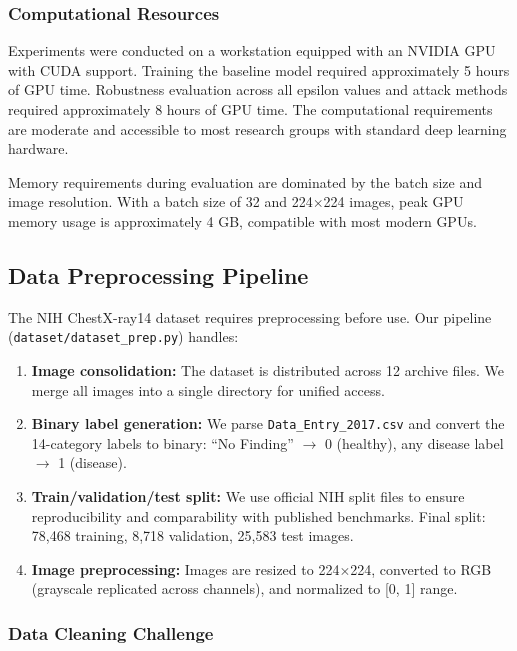 \documentclass[12pt,a4paper]{article}
\begin{document}
\subsubsection{Computational Resources}

Experiments were conducted on a workstation equipped with an NVIDIA GPU with CUDA support. Training the baseline model required approximately 5 hours of GPU time. Robustness evaluation across all epsilon values and attack methods required approximately 8 hours of GPU time. The computational requirements are moderate and accessible to most research groups with standard deep learning hardware.

Memory requirements during evaluation are dominated by the batch size and image resolution. With a batch size of 32 and 224$\times$224 images, peak GPU memory usage is approximately 4 GB, compatible with most modern GPUs.

\subsection{Data Preprocessing Pipeline}

The NIH ChestX-ray14 dataset requires preprocessing before use. Our pipeline (\texttt{dataset/dataset\_prep.py}) handles:

\begin{enumerate}[leftmargin=*]
    \item \textbf{Image consolidation:} The dataset is distributed across 12 archive files. We merge all images into a single directory for unified access.
    
    \item \textbf{Binary label generation:} We parse \texttt{Data\_Entry\_2017.csv} and convert the 14-category labels to binary: ``No Finding'' $\rightarrow$ 0 (healthy), any disease label $\rightarrow$ 1 (disease).
    
    \item \textbf{Train/validation/test split:} We use official NIH split files to ensure reproducibility and comparability with published benchmarks. Final split: 78,468 training, 8,718 validation, 25,583 test images.
    
    \item \textbf{Image preprocessing:} Images are resized to 224$\times$224, converted to RGB (grayscale replicated across channels), and normalized to [0, 1] range.
\end{enumerate}

\subsubsection{Data Cleaning Challenge}
\end{document}
